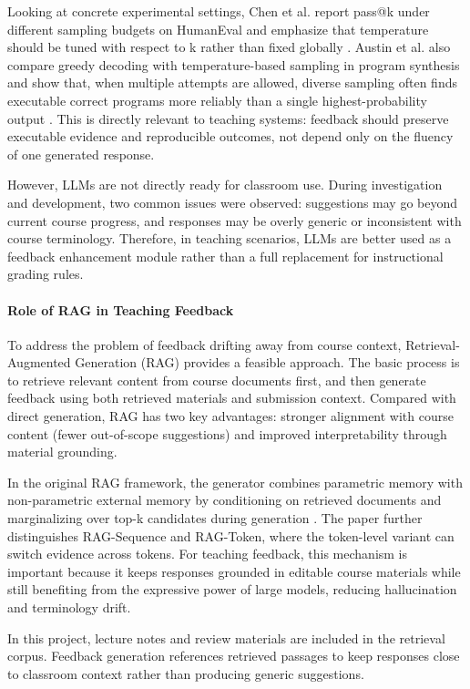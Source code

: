 Looking at concrete experimental settings, Chen et al. report pass@k under different sampling budgets on HumanEval and emphasize that temperature should be tuned with respect to k rather than fixed globally \cite{ref5_chen2021}. Austin et al. also compare greedy decoding with temperature-based sampling in program synthesis and show that, when multiple attempts are allowed, diverse sampling often finds executable correct programs more reliably than a single highest-probability output \cite{ref6_austin2021}. This is directly relevant to teaching systems: feedback should preserve executable evidence and reproducible outcomes, not depend only on the fluency of one generated response.

However, LLMs are not directly ready for classroom use. During investigation and development, two common issues were observed: suggestions may go beyond current course progress, and responses may be overly generic or inconsistent with course terminology. Therefore, in teaching scenarios, LLMs are better used as a feedback enhancement module rather than a full replacement for instructional grading rules.

\paragraph{Role of RAG in Teaching Feedback}
To address the problem of feedback drifting away from course context, Retrieval-Augmented Generation (RAG) provides a feasible approach. The basic process is to retrieve relevant content from course documents first, and then generate feedback using both retrieved materials and submission context. Compared with direct generation, RAG has two key advantages: stronger alignment with course content (fewer out-of-scope suggestions) and improved interpretability through material grounding.

In the original RAG framework, the generator combines parametric memory with non-parametric external memory by conditioning on retrieved documents and marginalizing over top-k candidates during generation \cite{ref3_lewis2020}. The paper further distinguishes RAG-Sequence and RAG-Token, where the token-level variant can switch evidence across tokens. For teaching feedback, this mechanism is important because it keeps responses grounded in editable course materials while still benefiting from the expressive power of large models, reducing hallucination and terminology drift.

In this project, lecture notes and review materials are included in the retrieval corpus. Feedback generation references retrieved passages to keep responses close to classroom context rather than producing generic suggestions.

